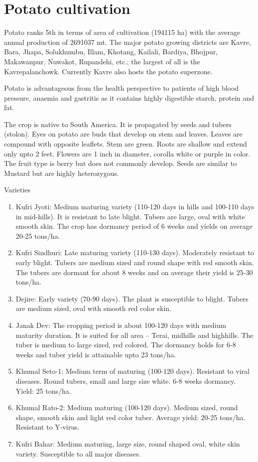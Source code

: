 \documentclass[
  openany]{book}
\providecommand{\tightlist}{%
  \setlength{\itemsep}{0pt}\setlength{\parskip}{0pt}}
\begin{document}
\hypertarget{potato-cultivation}{%
\section{Potato cultivation}\label{potato-cultivation}}

Potato ranks 5th in terms of area of cultivation (194115 ha) with the average annual production of 2691037 mt. The major potato growing districts are Kavre, Bara, Jhapa, Solukhumbu, Illam, Khotang, Kailali, Bardiya, Bhojpur, Makawanpur, Nuwakot, Rupandehi, etc.; the largest of all is the Kavrepalanchowk. Currently Kavre also hosts the potato superzone.

Potato is advantageous from the health perspective to patients of high blood pressure, anaemia and gastritis as it contains highly digestible starch, protein and fat.

The crop is native to South America. It is propagated by seeds and tubers (stolon). Eyes on potato are buds that develop on stem and leaves. Leaves are compound with opposite leaflets. Stem are green. Roots are shallow and extend only upto 2 feet. Flowers are 1 inch in diameter, corolla white or purple in color. The fruit type is berry but does not commonly develop. Seeds are similar to Mustard but are highly heterozygous.

Varieties

\begin{enumerate}
\def\labelenumi{\arabic{enumi}.}
\tightlist
\item
  Kufri Jyoti: Medium maturing variety (110-120 days in hills and 100-110 days in mid-hills). It is resistant to late blight. Tubers are large, oval with white smooth skin. The crop has dormancy period of 6 weeks and yields on average 20-25 tons/ha.
\item
  Kufri Sindhuri: Late maturing variety (110-130 days). Moderately resistant to early blight. Tubers are medium sized and round shape with red smooth skin. The tubers are dormant for about 8 weeks and on average their yield is 25-30 tons/ha.
\item
  Dejire: Early variety (70-90 days). The plant is susceptible to blight. Tubers are medium sized, oval with smooth red color skin.
\item
  Janak Dev: The cropping period is about 100-120 days with medium maturity duration. It is suited for all area -- Terai, midhills and highhills. The tuber is medium to large sized, red colored. The dormancy holds for 6-8 weeks and tuber yield is attainable upto 23 tons/ha.
\item
  Khumal Seto-1: Medium term of maturing (100-120 days). Resistant to viral diseases. Round tubers, small and large size white. 6-8 weeks dormancy. Yield: 25 tons/ha.
\item
  Khumal Rato-2: Medium maturing (100-120 days). Medium sized, round shape, smooth skin and light red color tuber. Average yield: 20-25 tons/ha. Resistant to Y-virus.
\item
  Kufri Bahar: Medium maturing, large size, round shaped oval, white skin variety. Susceptible to all major diseases.
\end{enumerate}
\end{document}
